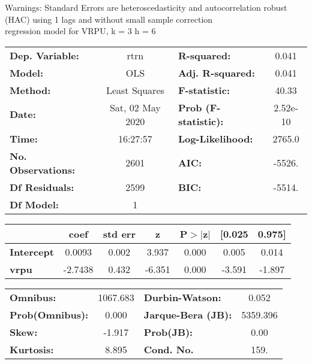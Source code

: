 Warnings: \newline
 [1] Standard Errors are heteroscedasticity and autocorrelation robust (HAC) using 1 lags and without small sample correction\\ 

regression model for VRPU, k = 3 h = 6\begin{center}
\begin{tabular}{lclc}
\toprule
\textbf{Dep. Variable:}    &       rtrn       & \textbf{  R-squared:         } &     0.041   \\
\textbf{Model:}            &       OLS        & \textbf{  Adj. R-squared:    } &     0.041   \\
\textbf{Method:}           &  Least Squares   & \textbf{  F-statistic:       } &     40.33   \\
\textbf{Date:}             & Sat, 02 May 2020 & \textbf{  Prob (F-statistic):} &  2.52e-10   \\
\textbf{Time:}             &     16:27:57     & \textbf{  Log-Likelihood:    } &    2765.0   \\
\textbf{No. Observations:} &        2601      & \textbf{  AIC:               } &    -5526.   \\
\textbf{Df Residuals:}     &        2599      & \textbf{  BIC:               } &    -5514.   \\
\textbf{Df Model:}         &           1      & \textbf{                     } &             \\
\bottomrule
\end{tabular}
\begin{tabular}{lcccccc}
                   & \textbf{coef} & \textbf{std err} & \textbf{z} & \textbf{P$> |$z$|$} & \textbf{[0.025} & \textbf{0.975]}  \\
\midrule
\textbf{Intercept} &       0.0093  &        0.002     &     3.937  &         0.000        &        0.005    &        0.014     \\
\textbf{vrpu}      &      -2.7438  &        0.432     &    -6.351  &         0.000        &       -3.591    &       -1.897     \\
\bottomrule
\end{tabular}
\begin{tabular}{lclc}
\textbf{Omnibus:}       & 1067.683 & \textbf{  Durbin-Watson:     } &    0.052  \\
\textbf{Prob(Omnibus):} &   0.000  & \textbf{  Jarque-Bera (JB):  } & 5359.396  \\
\textbf{Skew:}          &  -1.917  & \textbf{  Prob(JB):          } &     0.00  \\
\textbf{Kurtosis:}      &   8.895  & \textbf{  Cond. No.          } &     159.  \\
\bottomrule
\end{tabular}
\end{center}


